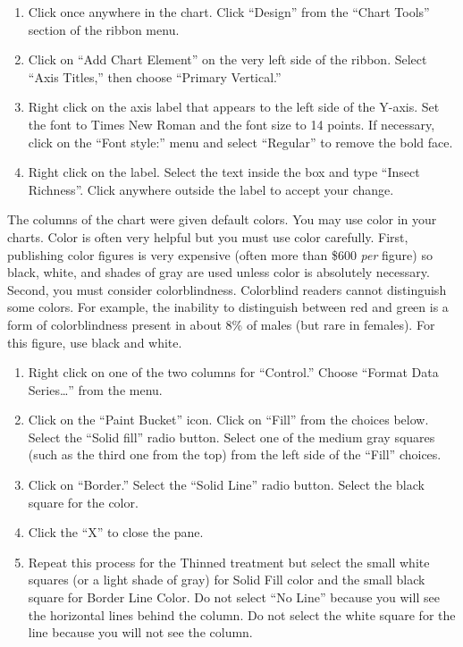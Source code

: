 \documentclass[12pt, hidelinks]{exam}
\begin{document}
\begin{enumerate}[resume]
	\item Click once anywhere in the chart. Click “Design” from the “Chart Tools” section of the ribbon menu. 

	\item Click on “Add Chart Element” on the very left side of the ribbon.  Select “Axis Titles,” then choose “Primary Vertical.”

	\item Right click on the axis label that appears to the left side of the Y-axis. Set the font to Times New Roman and the font size to 14 points. If necessary, click on the “Font style:” menu and select “Regular” to remove the bold face.

	\item Right click on the label. Select the text inside the box and type “Insect Richness”. Click anywhere outside the label to accept your change.
\end{enumerate}

The columns of the chart were given default colors. You may use color in your charts. Color is often very helpful but you must use color carefully. First, publishing color figures is very expensive (often more than \$600 \emph{per} figure) so black, white, and shades of gray are used unless color is absolutely necessary. Second, you must consider colorblindness. Colorblind readers cannot distinguish some colors. For example, the inability to distinguish between red and green is a form of colorblindness present in about 8\% of males (but rare in females). For this figure, use black and white.

\begin{enumerate}[resume]
	\item Right click on one of the two columns for “Control.” Choose “Format Data Series\dots” from the menu.

	\item Click on the “Paint Bucket” icon. Click on “Fill” from the choices below. Select the “Solid fill” radio button. Select one of the medium gray squares (such as the third one from the top) from the left side of the “Fill” choices.

	\item Click on “Border.” Select the “Solid Line” radio button. Select the black square for the color.

	\item Click the “X” to close the pane.

	\item Repeat this process for the Thinned treatment but select the small white squares (or a light shade of gray) for Solid Fill color  and the small black square for Border Line Color. Do not select “No Line” because you will see the horizontal lines behind the column. Do not select the white square for the line because you will not see the column.
\end{enumerate}
\end{document}
